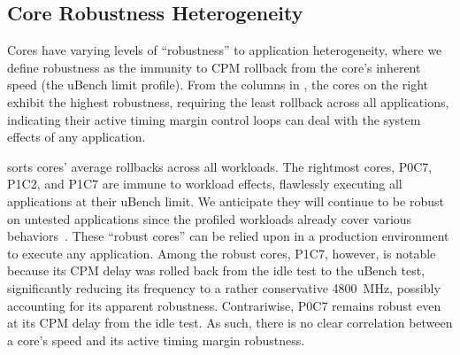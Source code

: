 \subsection{Core Robustness Heterogeneity}
\label{sec:process:workload:robustness}


Cores have varying levels of ``robustness'' to application heterogeneity, where we define robustness as the immunity to CPM rollback from the core's inherent speed (the uBench limit profile). From the columns in , the cores on the right exhibit the highest robustness, requiring the least rollback across all applications, indicating their active timing margin control loops can deal with the system effects of any application.

 sorts cores' average rollbacks across all workloads. The rightmost cores, P0C7, P1C2, and P1C7 are immune to workload effects, flawlessly executing all applications at their uBench limit. We anticipate they will continue to be robust on untested applications since the profiled workloads already cover various behaviors~\cite{song2018spec}. These ``robust cores'' can be relied upon in a production environment to execute any application. Among the robust cores, P1C7, however, is notable because its CPM delay was rolled back from the idle test to the uBench test, significantly reducing its frequency to a rather conservative 4800~MHz, possibly accounting for its apparent robustness. Contrariwise, P0C7 remains robust even at its CPM delay from the idle test. As such, there is no clear correlation between a core's speed and its active timing margin robustness. 


